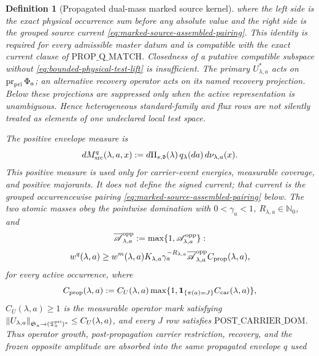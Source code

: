 \documentclass[11pt]{article}
\newtheorem{definition}[theorem]{Definition}
\newcommand{\one}{\mathbf 1}
\begin{document}
\begin{definition}[Propagated dual-mass marked source kernel]
where the left side is the exact physical occurrence sum before any
absolute value and the right side is the grouped source current
\eqref{eq:marked-source-assembled-pairing}.  This identity is required for
every admissible master datum and is compatible with the exact current
clause of $\mathrm{PROP\_Q\_MATCH}$.
Closedness of a putative compatible subspace without
\eqref{eq:bounded-physical-test-lift} is insufficient.  The primary
$U_{\lambda,a}^*$ acts on
$\operatorname{pr}_{\rm pri}\Phi_a$; an alternative recovery operator acts
on its named recovery projection.  Below these projections are suppressed
only when the active representation is unambiguous.  Hence
heterogeneous standard-family and flux rows are not silently treated as
elements of one undeclared local test space.

The positive envelope measure is
\begin{equation}
\label{eq:source-incidence-space}
 dM_{\rm src}^{q}(\lambda,a,x):=
 d\Pi_{s,\mathfrak d}(\lambda)\,q_\lambda(da)\,d\nu_{\lambda,a}(x).
\end{equation}
This positive measure is used only for carrier-event energies, measurable
coverage, and positive majorants.  It does not define the signed current;
that current is the grouped occurrencewise pairing
\eqref{eq:marked-source-assembled-pairing} below.
The two atomic masses obey the pointwise domination
with $0<\gamma_a<1$, $R_{\lambda,a}\in\mathbb N_0$, and
\begin{equation}
\label{eq:opposite-amplitude-floor}
 \overline{\mathscr A}_{\lambda,a}^{\rm opp}
 :=\max\{1,\mathscr A_{\lambda,a}^{\rm opp}\}:
\end{equation}
\begin{equation}
\label{eq:source-incidence-envelope}
 w^q(\lambda,a)\ge w^m(\lambda,a)K_{\lambda,a}
 \gamma_a^{-R_{\lambda,a}}\overline{\mathscr A}_{\lambda,a}^{\rm opp}
 C_{\rm prop}(\lambda,a),
\end{equation}
for every active occurrence, where
\begin{equation}
\label{eq:propagated-operator-carrier-mark}
 C_{\rm prop}(\lambda,a):=
 C_U(\lambda,a)\max\{1,\one_{\{\pi(a)=J\}}C_{\rm car}(\lambda,a)\},
\end{equation}
$C_U(\lambda,a)\ge1$ is the measurable
operator mark satisfying
$\|U_{\lambda,a}\|_{\mathfrak S_a\to(\mathfrak T_a^{\rm pri})^*}
\le C_U(\lambda,a)$, and every $J$ row satisfies
$\mathrm{POST\_CARRIER\_DOM}$.  Thus operator growth,
post-propagation carrier restriction, recovery, and the frozen
opposite amplitude are absorbed into the same propagated envelope $q$ used

\end{definition}
\end{document}
